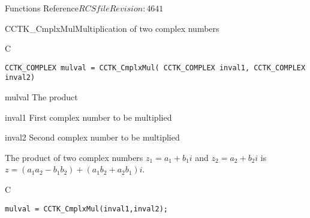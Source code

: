 \begin{cactuspart}{ Functions Reference}{$RCSfile$}{$Revision: 4641 $}
\begin{FunctionDescription}{CCTK\_CmplxMul}{Multiplication of two complex numbers}
\label{CCTK-CmplxMul}
\begin{SynopsisSection}
\begin{Synopsis}{C}
\begin{verbatim}CCTK_COMPLEX mulval = CCTK_CmplxMul( CCTK_COMPLEX inval1, CCTK_COMPLEX inval2)\end{verbatim}
\end{Synopsis}
\end{SynopsisSection}
\begin{ParameterSection}
\begin{Parameter}{mulval}
The product
\end{Parameter}
\begin{Parameter}{inval1}
First complex number to be multiplied
\end{Parameter}
\begin{Parameter}{inval2}
Second complex number to be multiplied
\end{Parameter}
\end{ParameterSection}
\begin{Discussion}
The product of two complex numbers $z_1=a_1+b_1 i$ and $z_2=a_2+b_2 i$ is
$z=(a_1 a_2 - b_1 b_2) + (a_1 b_2 + a_2 b_1)i$.
\end{Discussion}
\begin{ExampleSection}
\begin{Example}{C}
\begin{verbatim}
mulval = CCTK_CmplxMul(inval1,inval2);
\end{verbatim}
\end{Example}
\end{ExampleSection}
\end{FunctionDescription}




\end{cactuspart}
